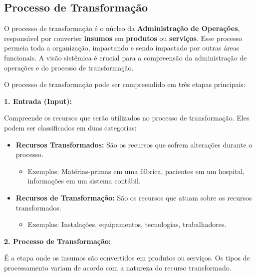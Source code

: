 \documentclass{article}
\begin{document}
\subsection{Processo de Transformação}

O processo de transformação é o núcleo da \textbf{Administração de Operações}, responsável por converter \textbf{insumos} em \textbf{produtos} ou \textbf{serviços}. Esse processo permeia toda a organização, impactando e sendo impactado por outras áreas funcionais. A visão sistêmica é crucial para a compreensão da administração de operações e do processo de transformação.

O processo de transformação pode ser compreendido em três etapas principais:

\textbf{1. Entrada (Input):}

Compreende os recursos que serão utilizados no processo de transformação. Eles podem ser classificados em duas categorias:

\begin{itemize}
\item \textbf{Recursos Transformados:} São os recursos que sofrem alterações durante o processo.
    \begin{itemize}
    \item Exemplos: Matérias-primas em uma fábrica, pacientes em um hospital, informações em um sistema contábil.
    \end{itemize}
\item \textbf{Recursos de Transformação:} São os recursos que atuam sobre os recursos transformados.
    \begin{itemize}
    \item Exemplos: Instalações, equipamentos, tecnologias, trabalhadores.
    \end{itemize}
\end{itemize}

\textbf{2. Processo de Transformação:}

É a etapa onde os insumos são convertidos em produtos ou serviços. Os tipos de processamento variam de acordo com a natureza do recurso transformado.
\end{document}
